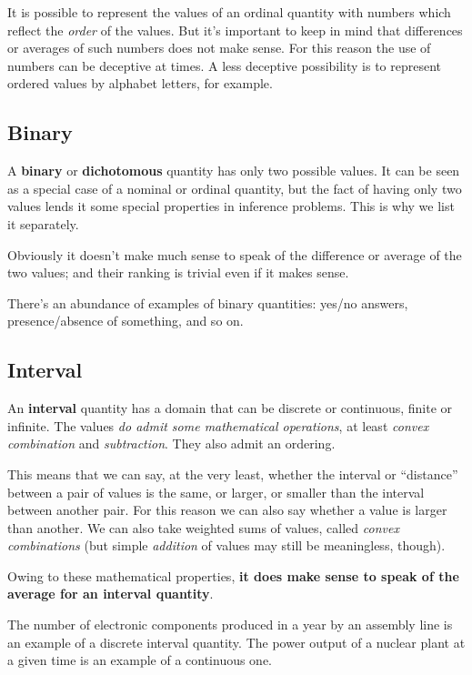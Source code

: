 \documentclass[
  a4paper,
  DIV=11,
  numbers=noendperiod,
  oneside]{scrreprt}
\begin{document}
It is possible to represent the values of an ordinal quantity with
numbers which reflect the \emph{order} of the values. But it's important
to keep in mind that differences or averages of such numbers does not
make sense. For this reason the use of numbers can be deceptive at
times. A less deceptive possibility is to represent ordered values by
alphabet letters, for example.

\hypertarget{binary}{%
\subsection{Binary}\label{binary}}

A {\textbf{binary}} or {\textbf{dichotomous}} quantity has only two
possible values. It can be seen as a special case of a nominal or
ordinal quantity, but the fact of having only two values lends it some
special properties in inference problems. This is why we list it
separately.

Obviously it doesn't make much sense to speak of the difference or
average of the two values; and their ranking is trivial even if it makes
sense.

There's an abundance of examples of binary quantities: yes/no answers,
presence/absence of something, and so on.

\hypertarget{interval}{%
\subsection{Interval}\label{interval}}

An {\textbf{interval}} quantity has a domain that can be discrete or
continuous, finite or infinite. The values {\emph{do admit some
mathematical operations}}, at least \emph{convex combination} and
\emph{subtraction}. They also admit an ordering.

This means that we can say, at the very least, whether the interval or
``distance'' between a pair of values is the same, or larger, or smaller
than the interval between another pair. For this reason we can also say
whether a value is larger than another. We can also take weighted sums
of values, called \emph{convex combinations} (but simple \emph{addition}
of values may still be meaningless, though).

Owing to these mathematical properties, {\textbf{it does make sense to
speak of the average for an interval quantity}}.

The number of electronic components produced in a year by an assembly
line is an example of a discrete interval quantity. The power output of
a nuclear plant at a given time is an example of a continuous one.
\end{document}
